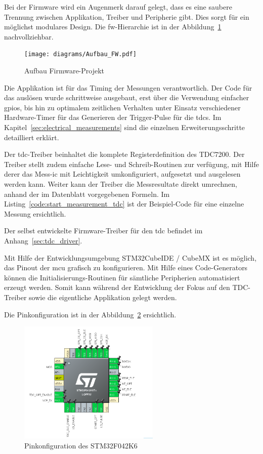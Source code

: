Bei der Firmware wird ein Augenmerk darauf gelegt, dass es eine saubere Trennung zwischen Applikation, Treiber und
Peripherie gibt. Dies sorgt für ein möglichst modulares Design. Die \acrshort{fw}-Hierarchie ist in der
Abbildung~\ref{fig:hierarchy_firmware} nachvollziehbar.

\begin{figure}[H]
    \centering
    \texttt{[image: diagrams/Aufbau\_FW.pdf]}
    \caption{Aufbau Firmware-Projekt}\label{fig:hierarchy_firmware}
\end{figure}

Die Applikation ist für das Timing der Messungen verantwortlich. Der Code für das auslösen wurde schrittweise ausgebaut,
erst über die Verwendung einfacher \acrshort{gpio}s, bis hin zu optimalem zeitlichen Verhalten unter Einsatz verschiedener
Hardware-Timer für das Generieren der Trigger-Pulse für die \acrshort{tdc}s. Im Kapitel~\ref{sec:electrical_measurements}
sind die einzelnen Erweiterungsschritte detailliert erklärt.

Der \acrshort{tdc}-Treiber beinhaltet die komplete Registerdefinition des TDC7200. Der Treiber stellt zudem einfache Lese- und
Schreib-Routinen zur verfügung, mit Hilfe derer das Mess-\acrshort{ic} mit Leichtigkeit umkonfiguriert, aufgesetzt und
ausgelesen werden kann. Weiter kann der Treiber die Messresultate direkt umrechnen, anhand der im Datenblatt vorgegebenen
Formeln. Im Listing~\ref{code:start_measurement_tdc} ist der Beispiel-Code für eine einzelne Messung ersichtlich.



Der selbst entwickelte Firmware-Treiber für den \acrshort{tdc} befindet im Anhang~\ref{sec:tdc_driver}.

Mit Hilfe der Entwicklungsumgebung STM32CubeIDE / CubeMX \cite{st2025stm32cubeide} ist es möglich, das Pinout der
\acrshort{mcu} grafisch zu konfigurieren. Mit Hilfe eines Code-Generators können die Initialisierungs-Routinen für
sämtliche Peripherien automatisiert erzeugt werden. Somit kann während der Entwicklung der Fokus auf den TDC-Treiber
sowie die eigentliche Applikation gelegt werden.

Die Pinkonfiguration ist in der Abbildung~\ref{fig:pinconfiguration_mcu} ersichtlich.

\begin{figure}[H]
    \centering
    \includegraphics[width=0.6\textwidth]{graphics/pinconfiguration_mcu.png}
    \caption{Pinkonfiguration des STM32F042K6}\label{fig:pinconfiguration_mcu}
\end{figure}

\pagebreak
